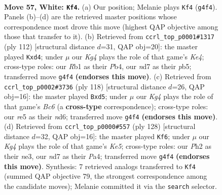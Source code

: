 \documentclass[11pt]{article}
\begin{document}
\clearpage

\begin{figure}[p]\centering
\begin{subfigure}{0.46\textwidth}\centering
\resizebox{\linewidth}{!}{%
\newchessgame
\chessboard[
  setfen={6k1/3n4/6P1/4r3/p1p3K1/P1P4p/2P4P/BR6 w - - 3 57},
  showmover=false,
  pgfstyle=straightmove, color=movearrow, markmove={g4-f4}
]}
\caption{}
\end{subfigure}\hfill
\begin{subfigure}{0.46\textwidth}\centering
\resizebox{\linewidth}{!}{%
\newchessgame
\chessboard[
  setfen={8/p4p1k/P7/1p3PpP/1P1pK3/8/2P5/8 w - - 0 57},
  showmover=false,
  pgfstyle=straightmove, color=movearrow, markmove={e4-d4}
]}
\caption{}
\end{subfigure}
\\[4pt]
\begin{subfigure}{0.46\textwidth}\centering
\resizebox{\linewidth}{!}{%
\newchessgame
\chessboard[
  setfen={8/8/ppBn1k2/3p4/P4P1p/3K1P1P/8/8 w - - 0 60},
  showmover=false,
  pgfstyle=straightmove, color=movearrow, markmove={c6-d5}
]}
\caption{}
\end{subfigure}\hfill
\begin{subfigure}{0.46\textwidth}\centering
\resizebox{\linewidth}{!}{%
\newchessgame
\chessboard[
  setfen={7k/3R4/1r2B3/p3K1pp/P7/4n1PP/8/8 w - - 0 65},
  showmover=false,
  pgfstyle=straightmove, color=movearrow, markmove={e5-f6}
]}
\caption{}
\end{subfigure}
\caption{\textbf{Move 57, White: \texttt{Kf4}.} (a) Our position; Melanie plays \texttt{Kf4} (\texttt{g4f4}). Panels (b)--(d) are the retrieved master positions whose correspondence most drove this move (highest QAP objective among those that transfer to it). (b) Retrieved from \texttt{ccrl\_top\_p0001\#1317} (ply 112) [structural distance $d$=31, QAP obj=20]: the master played \texttt{Kxd4}; under $\mu$ our \emph{Kg4} plays the role of that game's \emph{Ke4}; cross-type roles: our \emph{R}b1 as their \emph{P}b4, our \emph{n}d7 as their \emph{p}b5; transferred move \texttt{g4f4} \textbf{(endorses this move)}. (c) Retrieved from \texttt{ccrl\_top\_p0002\#3736} (ply 118) [structural distance $d$=26, QAP obj=16]: the master played \texttt{Bxd5}; under $\mu$ our \emph{Kg4} plays the role of that game's \emph{Bc6} (a \textbf{cross-type} correspondence); cross-type roles: our \emph{r}e5 as their \emph{n}d6; transferred move \texttt{g4f4} \textbf{(endorses this move)}. (d) Retrieved from \texttt{ccrl\_top\_p0000\#557} (ply 128) [structural distance $d$=32, QAP obj=16]: the master played \texttt{Kf6}; under $\mu$ our \emph{Kg4} plays the role of that game's \emph{Ke5}; cross-type roles: our \emph{P}h2 as their \emph{n}e3, our \emph{n}d7 as their \emph{P}a4; transferred move \texttt{g4f4} \textbf{(endorses this move)}. Synthesis: 7 retrieved analogs transferred to \texttt{Kf4} (summed QAP objective 79, the strongest correspondence among the candidate moves); Melanie committed it via the \texttt{search} selector.}
\label{fig:thought-m112}
\end{figure}
\end{document}
